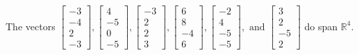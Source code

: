 \begin{exercise}
\begin{exerciseStatement}
  \end{exerciseStatement}
  \begin{exerciseAnswer}
   The vectors \(\left[\begin{array}{r}
-3 \\
-4 \\
2 \\
-3
\end{array}\right] , \left[\begin{array}{r}
4 \\
-5 \\
0 \\
-5
\end{array}\right] , \left[\begin{array}{r}
-3 \\
2 \\
2 \\
3
\end{array}\right] , \left[\begin{array}{r}
6 \\
8 \\
-4 \\
6
\end{array}\right] , \left[\begin{array}{r}
-2 \\
4 \\
-5 \\
-5
\end{array}\right] , \text{ and } \left[\begin{array}{r}
3 \\
2 \\
-5 \\
2
\end{array}\right]\) 
  	 do  
	span \(\mathbb{R}^4\).
  


  \end{exerciseAnswer}
\end{exercise}